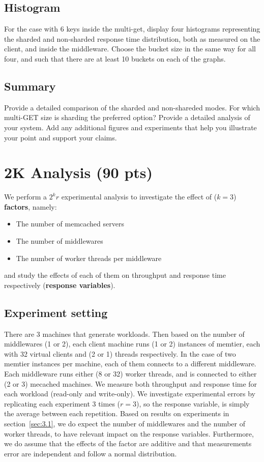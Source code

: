 \documentclass[11pt,a4paper]{article}
\begin{document}
\subsection{Histogram}

For the case with 6 keys inside the multi-get, display four histograms representing the sharded and non-sharded response time distribution, both as measured on the client, and inside the middleware. Choose the bucket size in the same way for all four, and such that there are at least 10 buckets on each of the graphs.

\subsection{Summary}

Provide a detailed comparison of the sharded and non-shareded modes. For which multi-GET size is sharding the preferred option? Provide a detailed analysis of your system. Add any additional figures and experiments that help you illustrate your point and support your claims.

\section{2K Analysis (90 pts)}

We perform a $2^kr$ experimental analysis to investigate the effect of ($k=3$) \textbf{factors}, namely:

\begin{itemize}
    \item The number of memcached servers
    \item The number of middlewares
    \item The number of worker threads per middleware
\end{itemize}

and study the effects of each of them on throughput and response time respectively (\textbf{response variables}).

\subsection{Experiment setting}

There are 3 machines that generate workloads. Then based on the number of middlewares (1 or 2), each client machine runs (1 or 2) instances of memtier, each with 32 virtual clients and (2 or 1) threads respectively. In the case of two memtier instances per machine, each of them connects to a different middleware. 
Each middleware runs either (8 or 32) worker threads, and is connected to either (2 or 3) mecached machines. We measure both throughput and response time for each workload (read-only and write-only).
We investigate experimental errors by replicating each experiment 3 times ($r=3$), so the response variable, is simply the average between each repetition.
Based on results on experiments in section~\ref{sec:3.1}, we do expect the number of middlewares and the number of worker threads, to have relevant impact on the response variables. Furthermore, we do assume that the effects of the factor are additive and that measurements error are independent and follow a normal distribution.\\
\end{document}
